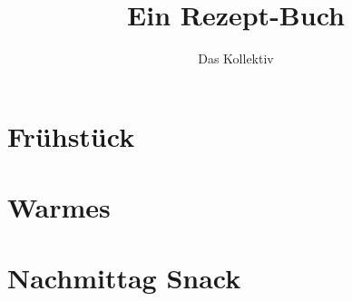 \documentclass[a4paper, 11pt]{article}
\begin{document}
    \title{Ein Rezept-Buch}
    \author{Das Kollektiv}
    \maketitle
    \tableofcontents

    \vspace{5em}

    \section{Frühstück}

    
    
    
    \section{Warmes}
    
    

   
   

    \section{Nachmittag Snack}
        


\end{document}
